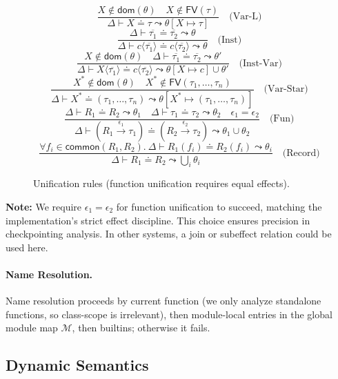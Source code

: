\begin{figure*}[t]
\centering
\[
\frac{X \notin \mathsf{dom}(\theta) \quad X \notin \mathsf{FV}(\tau)}{\Delta \vdash X \doteq \tau \leadsto \theta[X \mapsto \tau]} \quad \text{(Var-L)}
\]
\[
\frac{\Delta \vdash \overline{\tau_1} \doteq \overline{\tau_2} \leadsto \theta}{\Delta \vdash c\langle\overline{\tau_1}\rangle \doteq c\langle\overline{\tau_2}\rangle \leadsto \theta} \quad \text{(Inst)}
\]
\[
\frac{X \notin \mathsf{dom}(\theta) \quad \Delta \vdash \overline{\tau_1} \doteq \overline{\tau_2} \leadsto \theta'}{\Delta \vdash X\langle\overline{\tau_1}\rangle \doteq c\langle\overline{\tau_2}\rangle \leadsto \theta[X \mapsto c] \cup \theta'} \quad \text{(Inst-Var)}
\]
\[
\frac{X^* \notin \mathsf{dom}(\theta) \quad X^* \notin \mathsf{FV}(\tau_1, \ldots, \tau_n)}{\Delta \vdash X^* \doteq (\tau_1, \ldots, \tau_n) \leadsto \theta[X^* \mapsto (\tau_1, \ldots, \tau_n)]} \quad \text{(Var-Star)}
\]
\[
\frac{\Delta \vdash R_1 \doteq R_2 \leadsto \theta_1 \quad \Delta \vdash \tau_1 \doteq \tau_2 \leadsto \theta_2 \quad \epsilon_1 = \epsilon_2}{\Delta \vdash (R_1 \xrightarrow{\epsilon_1} \tau_1) \doteq (R_2 \xrightarrow{\epsilon_2} \tau_2) \leadsto \theta_1 \cup \theta_2} \quad \text{(Fun)}
\]
\[
\frac{\forall f_i \in \mathsf{common}(R_1, R_2).\ \Delta \vdash R_1(f_i) \doteq R_2(f_i) \leadsto \theta_i}{\Delta \vdash R_1 \doteq R_2 \leadsto \bigcup_i \theta_i} \quad \text{(Record)}
\]
\caption{Unification rules (function unification requires equal effects).}
\label{fig:unification}
\end{figure*}

\noindent\textbf{Note:} We require $\epsilon_1 = \epsilon_2$ for function unification to succeed, matching the implementation’s strict effect discipline. This choice ensures precision in checkpointing analysis. In other systems, a join or subeffect relation could be used here.

\paragraph{Name Resolution.}  
Name resolution proceeds by current function (we only analyze standalone functions, so class-scope is irrelevant), then module‐local entries in the global module map $\mathcal{M}$, then builtins; otherwise it fails.

\subsection{Dynamic Semantics}

